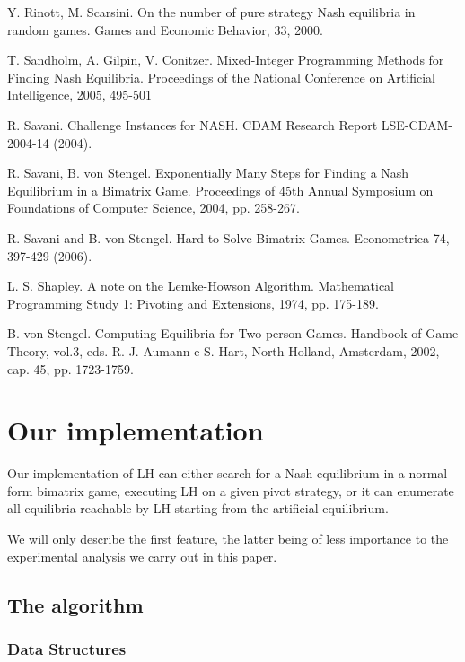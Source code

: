 \documentclass[11pt]{article}
\begin{document}
{\begin{thebibliography}{99}
Y. Rinott, M. Scarsini.
On the number of pure strategy Nash equilibria in random games.
Games and Economic Behavior, 33, 2000.

T. Sandholm, A. Gilpin, V. Conitzer. Mixed-Integer Programming Methods
for Finding Nash Equilibria. Proceedings of the National Conference on
Artificial Intelligence, 2005, 495-501

R. Savani. Challenge Instances for NASH. CDAM Research
Report LSE-CDAM-2004-14 (2004).

R. Savani, B. von Stengel.
Exponentially Many Steps for Finding a Nash Equilibrium in a Bimatrix Game.
Proceedings of 45th Annual Symposium on Foundations of Computer
Science, 2004, pp. 258-267.

R. Savani and B. von Stengel. Hard-to-Solve Bimatrix Games.
Econometrica 74, 397-429 (2006).

L. S. Shapley. A note on the Lemke-Howson Algorithm.
Mathematical Programming Study 1: Pivoting and Extensions, 1974, pp. 175-189.

B. von Stengel.
Computing Equilibria for Two-person Games.
Handbook of Game Theory, vol.3, eds. R. J. Aumann e S. Hart, North-Holland,
Amsterdam, 2002, cap. 45, pp. 1723-1759.





\end{thebibliography}}
\newpage

\appendix

\section{Our implementation}

Our implementation of LH can either search for a Nash equilibrium in a normal
form bimatrix game, executing LH on a given pivot strategy, or it
can enumerate all equilibria reachable by LH starting from the
artificial equilibrium.

We will only describe the first feature, the latter being of less
importance to the experimental analysis we carry out in this paper.

\subsection{The algorithm}

\subsubsection{Data Structures}
\end{document}
